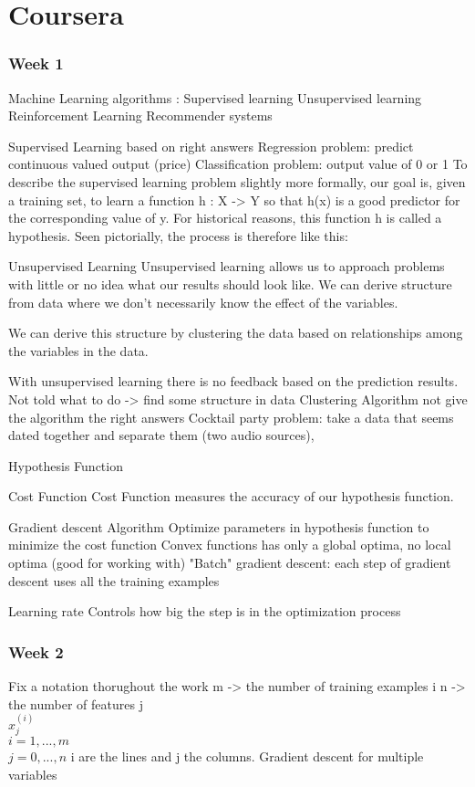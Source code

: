 \documentclass[12pt,a4paper]{report}
\begin{document}
\section{Coursera}
\subsubsection{Week 1}
Machine Learning algorithms :
	Supervised learning
	Unsupervised learning
	Reinforcement Learning
	Recommender systems
	
	
Supervised Learning
	based on right answers
	Regression problem: predict continuous valued output (price)
	Classification problem: output value of 0 or 1
	To describe the supervised learning problem slightly more formally, our goal is, given a training set, to learn a function h : X -> Y so that h(x) is a good predictor for the corresponding value of y. For historical reasons, this function h is called a hypothesis. Seen pictorially, the process is therefore like this:
	
Unsupervised Learning
	Unsupervised learning allows us to approach problems with little or no idea what our results should look like. We can derive structure from data where we don't necessarily know the effect of the variables.

We can derive this structure by clustering the data based on relationships among the variables in the data.

With unsupervised learning there is no feedback based on the prediction results.
	Not told what to do -> find some structure in data
	Clustering Algorithm
	not give the algorithm the right answers
	Cocktail party problem: take a data that seems dated together and separate them (two audio sources),  
	

Hypothesis Function
	
	
Cost Function
	Cost Function measures the accuracy of our hypothesis function.
		

Gradient descent Algorithm
	Optimize parameters in hypothesis function to minimize the cost function
	Convex functions has only a global optima, no local optima (good for working with)
	"Batch" gradient descent: each step of gradient descent uses all the training examples
	
	
Learning rate
	Controls how big the step is in the optimization process
	
	
\subsubsection{Week 2}
Fix a notation thorughout the work
	m -> the number of training examples i
	n -> the number of features j\\
	$ x^{(i)}_{j} $\\
	$ i = 1,...,m $\\
	$ j = 0,...,n $
	i are the lines and j the columns.
Gradient descent for multiple variables
	
\end{document}
